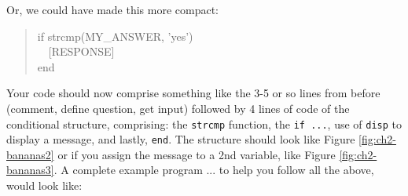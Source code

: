 \documentclass{tufte-book} %
\newenvironment{docspec}{\begin{quotation}\ttfamily\parskip0pt\parindent0pt\ignorespaces}{\end{quotation}}
\begin{document}
Or, we could have made this more compact:
\begin{docspec}
if strcmp(MY\_ANSWER, 'yes')
\\ \ \ [RESPONSE]
\\end
\end{docspec}

Your code should now comprise something like the 3-5 or so lines from before (comment, define question, get input) followed by 4 lines of code of the conditional structure, comprising: the \texttt{strcmp} function, the \texttt{if ...}, use of \texttt{disp} to display a message, and lastly, \texttt{end}. The structure should look like Figure \ref{fig:ch2-bananas2} or if you assign the message to a 2nd variable, like Figure \ref{fig:ch2-bananas3}. A complete example program ... to help you follow all the above, would look like: 

\newpage
\end{document}
